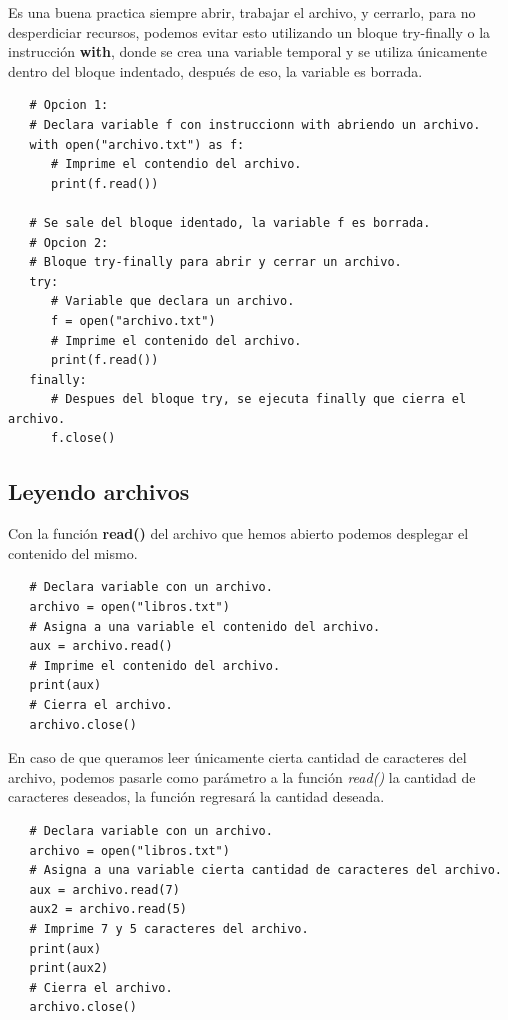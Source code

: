 Es una buena practica siempre abrir, trabajar el archivo, y cerrarlo, para no desperdiciar recursos, podemos evitar esto utilizando un bloque try-finally o la instrucción \textbf{with}, donde se crea una variable temporal y se utiliza únicamente dentro del bloque indentado, después de eso, la variable es borrada.
\begin{lstlisting}
   # Opcion 1:
   # Declara variable f con instruccionn with abriendo un archivo.
   with open("archivo.txt") as f:
      # Imprime el contendio del archivo.
      print(f.read())
      
   # Se sale del bloque identado, la variable f es borrada.
   # Opcion 2:
   # Bloque try-finally para abrir y cerrar un archivo.
   try:
      # Variable que declara un archivo.
      f = open("archivo.txt")
      # Imprime el contenido del archivo.
      print(f.read())
   finally:
      # Despues del bloque try, se ejecuta finally que cierra el archivo.
      f.close()
\end{lstlisting}


\subsection{Leyendo archivos}
\hspace{0.55cm}Con la función \textbf{read()} del archivo que hemos abierto podemos desplegar el contenido del mismo.
\begin{lstlisting}
   # Declara variable con un archivo.
   archivo = open("libros.txt")
   # Asigna a una variable el contenido del archivo.
   aux = archivo.read()
   # Imprime el contenido del archivo.
   print(aux)
   # Cierra el archivo.
   archivo.close()
\end{lstlisting}

En caso de que queramos leer únicamente cierta cantidad de caracteres del archivo, podemos pasarle como parámetro a la función \textit{read()} la cantidad de caracteres deseados, la función regresará la cantidad deseada.
\begin{lstlisting}
   # Declara variable con un archivo.
   archivo = open("libros.txt")
   # Asigna a una variable cierta cantidad de caracteres del archivo.
   aux = archivo.read(7)
   aux2 = archivo.read(5)
   # Imprime 7 y 5 caracteres del archivo.
   print(aux)
   print(aux2)
   # Cierra el archivo.
   archivo.close()
\end{lstlisting}

